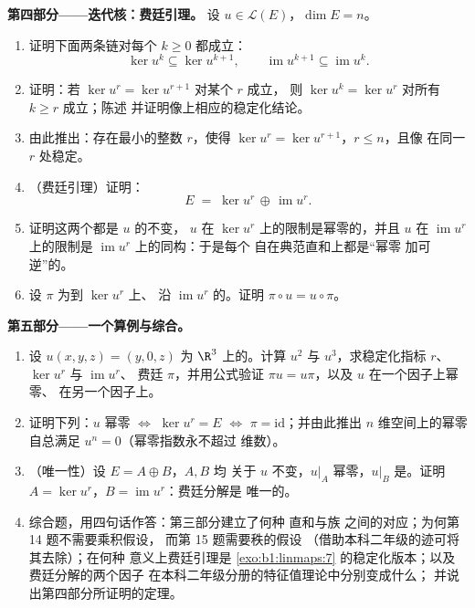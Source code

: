 \begin{problem}
\medskip
\noindent\textbf{第四部分——迭代核：费廷引理。}
设 $u \in \mathcal{L}(E)$，$\dim E = n$。
\begin{enumerate}[resume]
  \item 证明下面两条链对每个 $k \geq 0$ 都成立：
        \[
        \ker u^k \subseteq \ker u^{k+1},
        \qquad
        \operatorname{im} u^{k+1} \subseteq \operatorname{im}
        u^k .
        \]
  \item 证明：若 $\ker u^{r} = \ker u^{r+1}$ 对某个 $r$ 成立，
        则 $\ker u^{k} = \ker u^{r}$ 对所有 $k \geq r$ 成立；陈述
        并证明像上相应的稳定化结论。
  \item 由此推出：存在最小的整数 $r$，使得 $\ker
        u^{r} = \ker u^{r+1}$，$r \leq n$，且像
        在同一 $r$ 处稳定。
  \item （费廷引理）证明：
        \[
        E \;=\; \ker u^{r} \,\oplus\, \operatorname{im} u^{r} .
        \]
  \item 证明这两个都是 $u$ 的不变，
        $u$ 在 $\ker u^{r}$ 上的限制是幂零的，并且
        $u$ 在 $\operatorname{im} u^{r}$ 上的限制是
        $\operatorname{im} u^{r}$ 上的同构：于是每个
        自在典范直和上都是“幂零
        加可逆”的。
  \item 设 $\pi$ 为到 $\ker u^{r}$ 上、
        沿 $\operatorname{im} u^{r}$ 的。证明 $\pi \circ u = u
        \circ \pi$。
\end{enumerate}

\medskip
\noindent\textbf{第五部分——一个算例与综合。}
\begin{enumerate}[resume]
  \item 设 $u(x, y, z) = (y, 0, z)$ 为 $\R^3$ 上的。计算 $u^2$ 与
        $u^3$，求稳定化指标 $r$、
         $\ker u^{r}$ 与 $\operatorname{im} u^{r}$、
        费廷 $\pi$，并用公式验证
        $\pi u = u\pi$，以及 $u$ 在一个因子上幂零、
        在另一个因子上。
  \item 证明下列：$u$ 幂零 $\iff$ $\ker u^{r} =
        E$ $\iff$ $\pi = \mathrm{id}$；并由此推出
        $n$ 维空间上的幂零自总满足
        $u^{n} = 0$（幂零指数永不超过
        维数）。
  \item （唯一性）设 $E = A \oplus B$，$A, B$ 均
        关于 $u$ 不变，$u|_A$ 幂零，$u|_B$
        是。证明 $A = \ker u^{r}$，$B =
        \operatorname{im} u^{r}$：费廷分解是
        唯一的。
  \item 综合题，用四句话作答：第三部分建立了何种
        直和与族
        之间的对应；为何第 14 题不需要乘积假设，
        而第 15 题需要秩的假设
        （借助本科二年级的迹可将其去除）；在何种
        意义上费廷引理是
        \cref{exo:b1:linmaps:7} 的稳定化版本；以及费廷分解的两个因子
        在本科二年级分册的特征值理论中分别变成什么；
        并说出第四部分所证明的定理。
\end{enumerate}
\end{problem}
